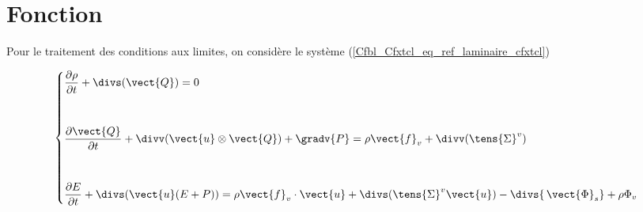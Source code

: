 
%
%
%
%



\hypertarget{cfxtcl}{}

\vspace{1cm}
\section*{Fonction}

Pour le traitement des conditions aux limites, on considère
le système (\ref{Cfbl_Cfxtcl_eq_ref_laminaire_cfxtcl})

\begin{equation}\label{Cfbl_Cfxtcl_eq_ref_laminaire_cfxtcl}
\left\{
\begin{aligned}
&\displaystyle\frac{\partial\rho}{\partial t} + \divs(\vect{Q}) = 0 \\[1em]
&\\
&\displaystyle\frac{\partial\vect{Q}}{\partial t}
+ \divv(\vect{u} \otimes \vect{Q}) + \gradv{P}
= \rho \vect{f}_v + \divv(\tens{\Sigma}^v) \\[1em]
&\\
&\displaystyle\frac{\partial E}{\partial t} + \divs( \vect{u} (E+P) )
= \rho\vect{f}_v\cdot\vect{u} + \divs(\tens{\Sigma}^v \vect{u})
- \divs{\,\vect{\Phi}_s} + \rho\Phi_v
\end{aligned}
\right.
\end{equation}

